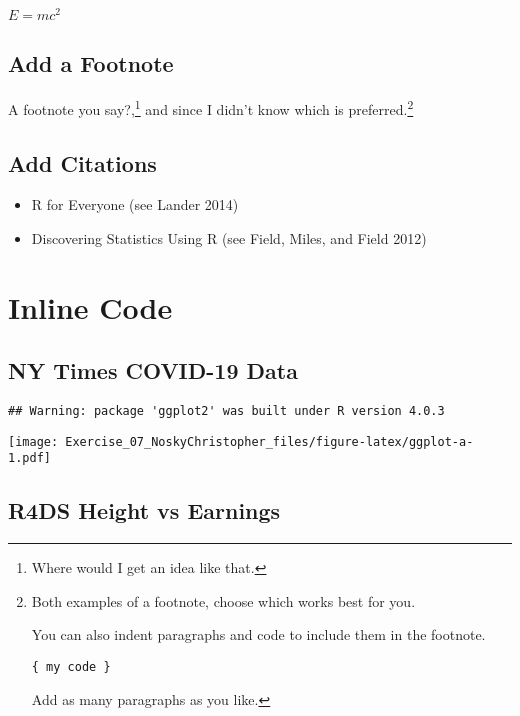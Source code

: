 \documentclass[
]{article}
\providecommand{\tightlist}{%
  \setlength{\itemsep}{0pt}\setlength{\parskip}{0pt}}
\begin{document}
\hypertarget{emc2}{%
\subparagraph{\texorpdfstring{\(E=mc^2\)}{E=mc\^{}2}}\label{emc2}}

\hypertarget{add-a-footnote}{%
\subsection{Add a Footnote}\label{add-a-footnote}}

A footnote you say?,\footnote{Where would I get an idea like that.} and
since I didn't know which is preferred.\footnote{Both examples of a
  footnote, choose which works best for you.

  You can also indent paragraphs and code to include them in the
  footnote.

  \texttt{\{\ my\ code\ \}}

  Add as many paragraphs as you like.}

\hypertarget{add-citations}{%
\subsection{Add Citations}\label{add-citations}}

\begin{itemize}
\tightlist
\item
  R for Everyone (see Lander 2014)
\item
  Discovering Statistics Using R (see Field, Miles, and Field 2012)
\end{itemize}

\hypertarget{inline-code}{%
\section{Inline Code}\label{inline-code}}

\hypertarget{ny-times-covid-19-data}{%
\subsection{NY Times COVID-19 Data}\label{ny-times-covid-19-data}}

\begin{verbatim}
## Warning: package 'ggplot2' was built under R version 4.0.3
\end{verbatim}

\texttt{[image: Exercise\_07\_NoskyChristopher\_files/figure-latex/ggplot-a-1.pdf]}

\hypertarget{r4ds-height-vs-earnings}{%
\subsection{R4DS Height vs Earnings}\label{r4ds-height-vs-earnings}}
\end{document}
